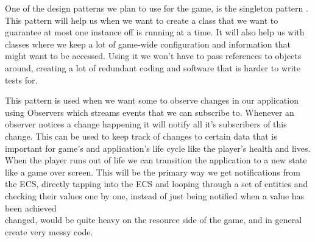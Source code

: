 
One of the design patterns we plan to use for the game, is the singleton pattern \cite{wiki:singleton}. This pattern will help us when we want to create a class that we want to guarantee at most one instance off is running at a time. It will also help us with classes where we keep a lot of game-wide configuration and information that might want to be accessed. Using it we won't have to pass references to objects around, creating a lot of redundant coding and software that is harder to write tests for.

This pattern is used when we want some to observe changes in our application using Observers\cite{wiki:observer} which streams events that we can subscribe to. Whenever an observer notices a change happening it will notify all it's subscribers of this change. This can be used to keep track of changes to certain data that is important for game's and application's life cycle like the player's health and lives. When the player runs out of life we can transition the application to a new state like a game over screen. This will be the primary way we get notifications from the ECS, directly tapping into the ECS and looping through a set of entities and checking their values one by one, instead of just being notified when a value has been achieved\\changed, would be quite heavy on the resource side of the game, and in general create very messy code.
